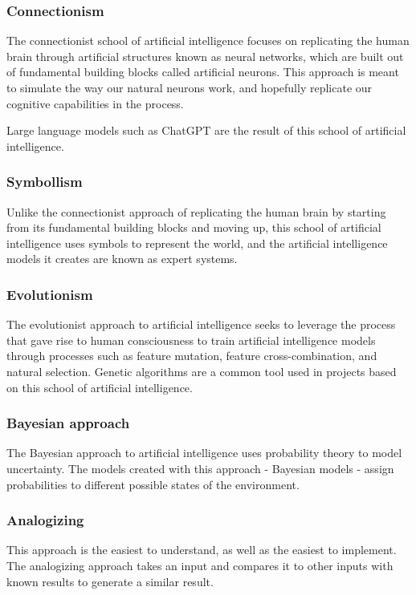 \documentclass[masterthesis]{fer}
\begin{document}
\subsubsection{Connectionism}
The connectionist school of artificial intelligence focuses on replicating the human brain through artificial structures known as neural networks, which are built out of fundamental building blocks called artificial neurons. This approach is meant to simulate the way our natural neurons work, and hopefully replicate our cognitive capabilities in the process.

Large language models such as ChatGPT are the result of this school of artificial intelligence.
\subsubsection{Symbollism}
Unlike the connectionist approach of replicating the human brain by starting from its fundamental building blocks and moving up, this school of artificial intelligence uses symbols to represent the world, and the artificial intelligence models it creates are known as expert systems.
\subsubsection{Evolutionism}
The evolutionist approach to artificial intelligence seeks to leverage the process that gave rise to human consciousness to train artificial intelligence models through processes such as feature mutation, feature cross-combination, and natural selection. Genetic algorithms are a common tool used in projects based on this school of artificial intelligence.
\subsubsection{Bayesian approach}
The Bayesian approach to artificial intelligence uses probability theory to model uncertainty. The models created with this approach - Bayesian models - assign probabilities to different possible states of the environment.
\subsubsection{Analogizing}
This approach is the easiest to understand, as well as the easiest to implement. The analogizing approach takes an input and compares it to other inputs with known results to generate a similar result.
\end{document}
